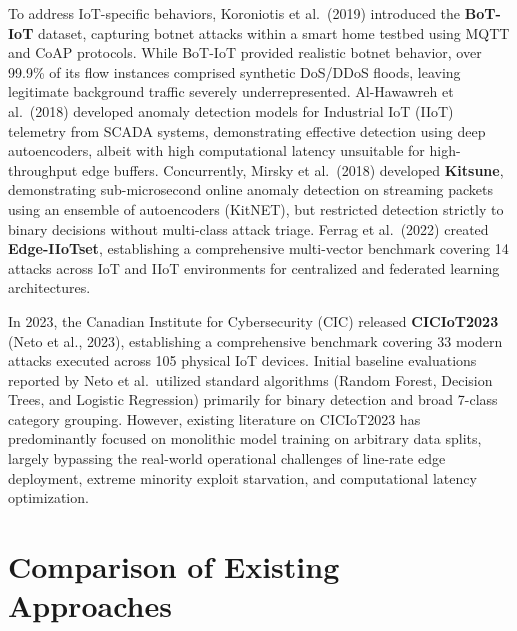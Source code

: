 \documentclass[12pt,a4paper]{report}
\begin{document}
To address IoT-specific behaviors, Koroniotis et al.\ (2019) introduced the \textbf{BoT-IoT} dataset, capturing botnet attacks within a smart home testbed using MQTT and CoAP protocols. While BoT-IoT provided realistic botnet behavior, over 99.9\% of its flow instances comprised synthetic DoS/DDoS floods, leaving legitimate background traffic severely underrepresented. Al-Hawawreh et al.\ (2018) developed anomaly detection models for Industrial IoT (IIoT) telemetry from SCADA systems, demonstrating effective detection using deep autoencoders, albeit with high computational latency unsuitable for high-throughput edge buffers. Concurrently, Mirsky et al.\ (2018) developed \textbf{Kitsune}, demonstrating sub-microsecond online anomaly detection on streaming packets using an ensemble of autoencoders (KitNET), but restricted detection strictly to binary decisions without multi-class attack triage. Ferrag et al.\ (2022) created \textbf{Edge-IIoTset}, establishing a comprehensive multi-vector benchmark covering 14 attacks across IoT and IIoT environments for centralized and federated learning architectures.

In 2023, the Canadian Institute for Cybersecurity (CIC) released \textbf{CICIoT2023} (Neto et al., 2023), establishing a comprehensive benchmark covering 33 modern attacks executed across 105 physical IoT devices. Initial baseline evaluations reported by Neto et al.\ utilized standard algorithms (Random Forest, Decision Trees, and Logistic Regression) primarily for binary detection and broad 7-class category grouping. However, existing literature on CICIoT2023 has predominantly focused on monolithic model training on arbitrary data splits, largely bypassing the real-world operational challenges of line-rate edge deployment, extreme minority exploit starvation, and computational latency optimization.

\section{Comparison of Existing Approaches}
\end{document}
